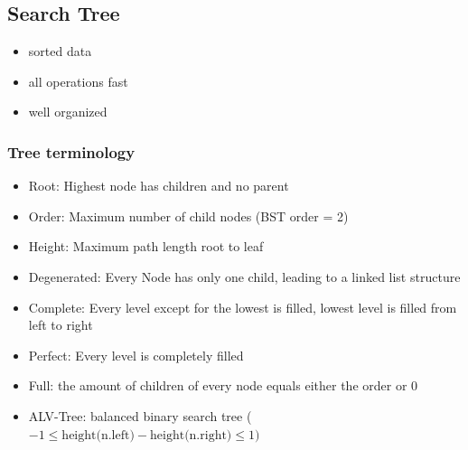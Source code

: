 \subsection{Search Tree}
    \begin{itemize}
        \item sorted data
        \item all operations fast
        \item well organized
    \end{itemize}
    \subsubsection{Tree terminology} \label{sec_tree_terminology}
        \begin{itemize}
            \item Root: Highest node has children and no parent
            \item Order: Maximum number of child nodes (BST order = 2)
            \item Height: Maximum path length root to leaf
            \item Degenerated: Every Node has only one child, leading to a linked list structure
            \item Complete: Every level except for the lowest is filled, lowest level is filled from left to right
            \item Perfect: Every level is completely filled
            \item Full: the amount of children of every node equals either the order or 0
            \item ALV-Tree: balanced binary search tree ($-1 \leq \text{height(n.left)} - \text{height(n.right)} \leq 1)$
        \end{itemize}
    
